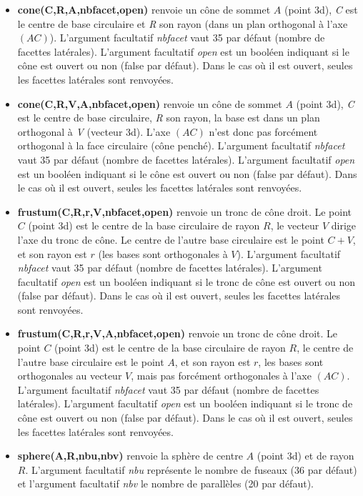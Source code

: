 \begin{itemize}
    \item \textbf{cone(C,R,A,nbfacet,open)} renvoie un cône de sommet $A$ (point 3d), \emph{C} est le centre de base circulaire et \emph{R} son rayon (dans un plan orthogonal à l'axe $(AC)$). L'argument facultatif \emph{nbfacet} vaut 35 par défaut (nombre de facettes latérales). L'argument facultatif \emph{open} est un booléen indiquant si le cône est ouvert ou non (false par défaut). Dans le cas où il est ouvert, seules les facettes latérales sont renvoyées.    
    
    \item \textbf{cone(C,R,V,A,nbfacet,open)} renvoie un cône de sommet $A$ (point 3d), \emph{C} est le centre de base circulaire, \emph{R} son rayon, la base est dans un plan orthogonal à \emph{V} (vecteur 3d). L'axe $(AC)$ n'est donc pas forcément orthogonal à la face circulaire (cône penché). L'argument facultatif \emph{nbfacet} vaut 35 par défaut (nombre de facettes latérales). L'argument facultatif \emph{open} est un booléen indiquant si le cône est ouvert ou non (false par défaut). Dans le cas où il est ouvert, seules les facettes latérales sont renvoyées.        

    \item \textbf{frustum(C,R,r,V,nbfacet,open)} renvoie un tronc de cône droit. Le point $C$ (point 3d) est le centre de la base circulaire de rayon $R$, le vecteur $V$ dirige l'axe du tronc de cône. Le centre de l'autre base circulaire est le point $C+V$, et son rayon est $r$ (les bases sont orthogonales à $V$). L'argument facultatif \emph{nbfacet} vaut 35 par défaut (nombre de facettes latérales). L'argument facultatif \emph{open} est un booléen indiquant si le tronc de cône est ouvert ou non (false par défaut). Dans le cas où il est ouvert, seules les facettes latérales sont renvoyées.    
    
    \item \textbf{frustum(C,R,r,V,A,nbfacet,open)} renvoie un tronc de cône droit. Le point $C$ (point 3d) est le centre de la base circulaire de rayon $R$, le centre de l'autre base circulaire est le point $A$, et son rayon est $r$, les bases sont orthogonales au vecteur $V$, mais pas forcément orthogonales à l'axe $(AC)$. L'argument facultatif \emph{nbfacet} vaut 35 par défaut (nombre de facettes latérales). L'argument facultatif \emph{open} est un booléen indiquant si le tronc de cône est ouvert ou non (false par défaut). Dans le cas où il est ouvert, seules les facettes latérales sont renvoyées.

    \item \textbf{sphere(A,R,nbu,nbv)} renvoie la sphère de centre $A$ (point 3d) et de rayon $R$. L'argument facultatif \emph{nbu} représente le nombre de fuseaux (36 par défaut) et l'argument facultatif \emph{nbv} le nombre de parallèles (20 par défaut).
\end{itemize}

